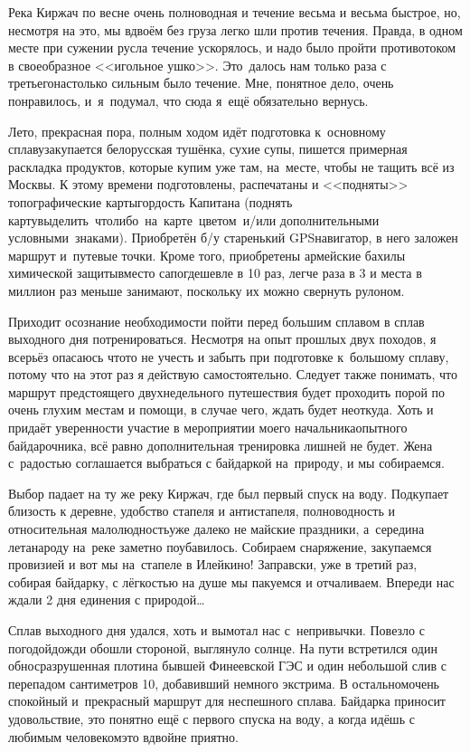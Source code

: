 Река Киржач по весне очень полноводная и течение весьма и весьма быстрое, но, несмотря на это, мы вдвоём без груза легко шли против течения. Правда, в одном месте при сужении русла течение ускорялось, и надо было пройти противотоком в своеобразное <<игольное ушко>>. Это~далось нам только раза с третьего\mdash настолько сильным было течение. Мне, понятное дело, очень понравилось, и~я~подумал, что сюда я~ещё обязательно вернусь. 

Лето, прекрасная пора, полным ходом идёт подготовка к~основному сплаву\mdash закупается белорусская тушёнка, сухие супы, пишется примерная раскладка продуктов, которые купим уже там, на~месте, чтобы не тащить всё из Москвы. К этому времени подготовлены, распечатаны и <<подняты>> топографические карты\mdash гордость Капитана (поднять карту\mdash выделить что\sdash либо на карте цветом и/или дополнительными условными знаками). Приобретён б/у старенький GPS\sdash навигатор, в него заложен маршрут и~путевые точки. Кроме того, приобретены армейские бахилы химической защиты\mdash вместо сапог\mdash дешевле в 10 раз, легче раза в 3 и места в миллион раз меньше занимают, поскольку их можно свернуть рулоном. 

Приходит осознание необходимости пойти перед большим сплавом в сплав выходного дня потренироваться. Несмотря на опыт прошлых двух походов, я всерьёз опасаюсь что\sdash то не учесть и забыть при подготовке к~большому сплаву, потому что на этот раз я действую самостоятельно. Следует также понимать, что маршрут предстоящего двухнедельного путешествия будет проходить порой по очень глухим местам и помощи, в случае чего, ждать будет неоткуда. Хоть и придаёт уверенности участие в мероприятии моего начальника\mdash опытного байдарочника, всё равно дополнительная тренировка лишней не будет. Жена с~радостью соглашается выбраться с байдаркой на~природу, и мы собираемся.

Выбор падает на ту же реку Киржач, где был первый спуск на воду. Подкупает близость к деревне, удобство стапеля и антистапеля, полноводность и относительная малолюдность\mdash уже далеко не майские праздники, а~середина лета\mdash народу на~реке заметно поубавилось. Собираем снаряжение, закупаемся провизией и вот мы на~стапеле в Илейкино! Заправски, уже в третий раз, собирая байдарку, с лёгкостью на душе мы пакуемся и отчаливаем. Впереди нас ждали 2 дня единения с природой\ldots

Сплав выходного дня удался, хоть и вымотал нас с~непривычки. Повезло с погодой\mdash дожди обошли стороной, выглянуло солнце. На пути встретился один обнос\mdash разрушенная плотина бывшей Финеевской ГЭС и один небольшой слив с перепадом сантиметров 10, добавивший немного экстрима. В остальном\mdash очень спокойный и~прекрасный маршрут для неспешного сплава. Байдарка приносит удовольствие, это понятно ещё с первого спуска на воду, а когда идёшь с любимым человеком\mdash это вдвойне приятно.

